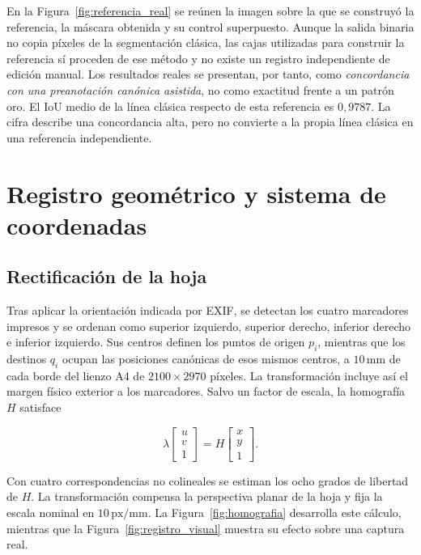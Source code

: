 En la Figura~\ref{fig:referencia_real} se reúnen la imagen sobre la que se construyó la referencia, la máscara obtenida y su control superpuesto. Aunque la salida binaria no copia píxeles de la segmentación clásica, las cajas utilizadas para construir la referencia sí proceden de ese método y no existe un registro independiente de edición manual. Los resultados reales se presentan, por tanto, como \emph{concordancia con una preanotación canónica asistida}, no como exactitud frente a un patrón oro. El IoU medio de la línea clásica respecto de esta referencia es $0{,}9787$. La cifra describe una concordancia alta, pero no convierte a la propia línea clásica en una referencia independiente.

\section{Registro geométrico y sistema de coordenadas}

\subsection{Rectificación de la hoja}

Tras aplicar la orientación indicada por EXIF, se detectan los cuatro marcadores impresos y se ordenan como superior izquierdo, superior derecho, inferior derecho e inferior izquierdo. Sus centros definen los puntos de origen $p_i$, mientras que los destinos $q_i$ ocupan las posiciones canónicas de esos mismos centros, a $10\,\text{mm}$ de cada borde del lienzo A4 de $2100\times2970$ píxeles. La transformación incluye así el margen físico exterior a los marcadores. Salvo un factor de escala, la homografía $H$ satisface

\begin{equation}
\lambda
\begin{bmatrix}
u\\v\\1
\end{bmatrix}
=
H
\begin{bmatrix}
x\\y\\1
\end{bmatrix}.
\label{eq:homografia_metodo}
\end{equation}

Con cuatro correspondencias no colineales se estiman los ocho grados de libertad de $H$. La transformación compensa la perspectiva planar de la hoja y fija la escala nominal en $10\,\text{px/mm}$. La Figura~\ref{fig:homografia} desarrolla este cálculo, mientras que la Figura~\ref{fig:registro_visual} muestra su efecto sobre una captura real.

